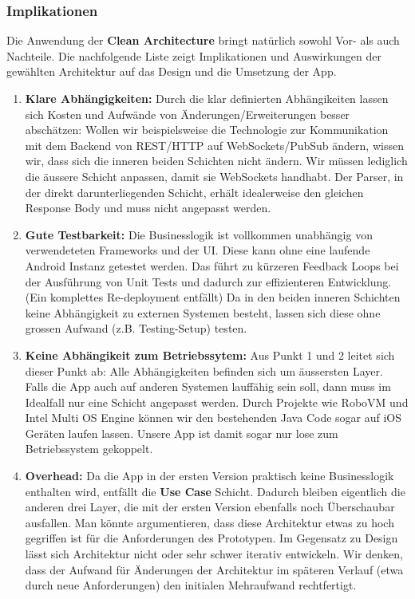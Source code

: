 \documentclass[a4paper,10pt,xetex]{article}
\begin{document}
\subsubsection{Implikationen}\label{implications}
Die Anwendung der \textbf{Clean Architecture} bringt natürlich sowohl Vor- als
auch Nachteile. Die nachfolgende Liste zeigt Implikationen und Auswirkungen der
gewählten Architektur auf das Design und die Umsetzung der App.
\begin{enumerate}
  \item \textbf{Klare Abhängigkeiten:} Durch die klar definierten Abhängikeiten
    lassen sich Kosten und Aufwände von Änderungen/Erweiterungen besser abschätzen:
    Wollen wir beispielsweise die Technologie zur Kommunikation mit dem
    Backend von REST/HTTP auf WebSockets/PubSub ändern, wissen wir, dass sich
    die inneren beiden Schichten nicht ändern. Wir müssen lediglich die äussere
    Schicht anpassen, damit sie WebSockets handhabt. Der Parser, in der direkt
    darunterliegenden Schicht, erhält idealerweise den gleichen Response Body
    und muss nicht angepasst werden.
  \item \textbf{Gute Testbarkeit:} Die Businesslogik ist vollkommen unabhängig
    von verwendeteten Frameworks und der UI. Diese kann ohne eine laufende
    Android Instanz getestet werden. Das führt zu kürzeren Feedback Loops
    bei der Ausführung von Unit Tests und dadurch zur effizienteren Entwicklung.
    (Ein komplettes Re-deployment entfällt)
    Da in den beiden inneren Schichten keine Abhängigkeit zu externen Systemen
    besteht, lassen sich diese ohne grossen Aufwand (z.B. Testing-Setup) testen.
  \item \textbf{Keine Abhängikeit zum Betriebssytem:} Aus Punkt 1 und 2
    leitet sich dieser Punkt ab: Alle Abhängigkeiten befinden sich um
    äussersten Layer. Falls die App auch auf anderen Systemen lauffähig sein soll,
    dann muss im Idealfall nur eine Schicht angepasst werden. Durch Projekte
    wie RoboVM und Intel Multi OS Engine können wir den bestehenden Java Code
    sogar auf iOS Geräten laufen lassen. Unsere App ist damit sogar nur lose
    zum Betriebssystem gekoppelt.
  \item \textbf{Overhead:} Da die App in der ersten Version praktisch keine
    Businesslogik enthalten wird, entfällt die \textbf{Use Case} Schicht.
    Dadurch bleiben eigentlich die anderen drei Layer, die mit der ersten
    Version ebenfalls noch Überschaubar ausfallen. Man könnte argumentieren,
    dass diese Architektur etwas zu hoch gegriffen ist für die Anforderungen
    des Prototypen. Im Gegensatz zu Design lässt sich Architektur nicht oder
    sehr schwer iterativ entwickeln. Wir denken, dass der Aufwand für Änderungen
    der Architektur im späteren Verlauf (etwa durch neue Anforderungen) den
    initialen Mehraufwand rechtfertigt.
\end{enumerate}
\end{document}
